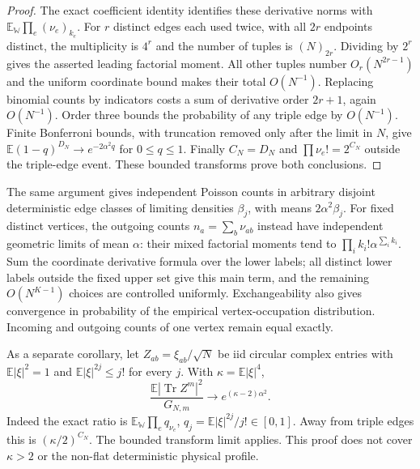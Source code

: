 \begin{proof}
The exact coefficient identity identifies these derivative norms with
$\mathbb E_{\mathbb W}\prod_e(\nu_e)_{k_e}$.
For $r$ distinct edges each used twice, with all $2r$ endpoints distinct,
the multiplicity is $4^r$ and the number of tuples is $(N)_{2r}$.
Dividing by $2^r$ gives the asserted leading factorial moment. All
other tuples number $O_r(N^{2r-1})$ and the uniform coordinate bound
makes their total $O(N^{-1})$. Replacing binomial counts by indicators
costs a sum of derivative order $2r+1$, again $O(N^{-1})$.
Order three bounds the probability of any triple edge by $O(N^{-1})$.
Finite Bonferroni bounds, with truncation removed only after the limit
in $N$, give $\mathbb E(1-q)^{D_N}\to e^{-2\alpha^2q}$ for $0\le q\le1$.
Finally $C_N=D_N$ and $\prod\nu_e!=2^{C_N}$ outside the triple-edge
event. These bounded transforms prove both conclusions.
\end{proof}

The same argument gives independent Poisson counts in arbitrary disjoint
deterministic edge classes of limiting densities $\beta_j$, with means
$2\alpha^2\beta_j$. For fixed distinct vertices, the outgoing counts
$n_a=\sum_b\nu_{ab}$ instead have independent geometric limits of mean
$\alpha$: their mixed factorial moments tend to
$\prod_i k_i!\alpha^{\sum_i k_i}$. Sum the coordinate derivative formula
over the lower labels; all distinct lower labels outside the fixed upper
set give this main term, and the remaining $O(N^{K-1})$ choices are
controlled uniformly. Exchangeability also gives convergence in probability
of the empirical vertex-occupation distribution. Incoming and outgoing
counts of one vertex remain equal exactly.

As a separate corollary, let $Z_{ab}=\xi_{ab}/\sqrt N$ be iid circular
complex entries with $\mathbb E|\xi|^2=1$ and
$\mathbb E|\xi|^{2j}\le j!$ for every $j$. With
$\kappa=\mathbb E|\xi|^4$,
\[
 \frac{\mathbb E|\operatorname{Tr}Z^m|^2}{G_{N,m}}
       \longrightarrow e^{(\kappa-2)\alpha^2}.
\]
Indeed the exact ratio is $\mathbb E_{\mathbb W}\prod_e q_{\nu_e}$,
$q_j=\mathbb E|\xi|^{2j}/j!\in[0,1]$. Away from triple edges this is
$(\kappa/2)^{C_N}$. The bounded transform limit applies. This proof
does not cover $\kappa>2$ or the non-flat deterministic physical profile.
